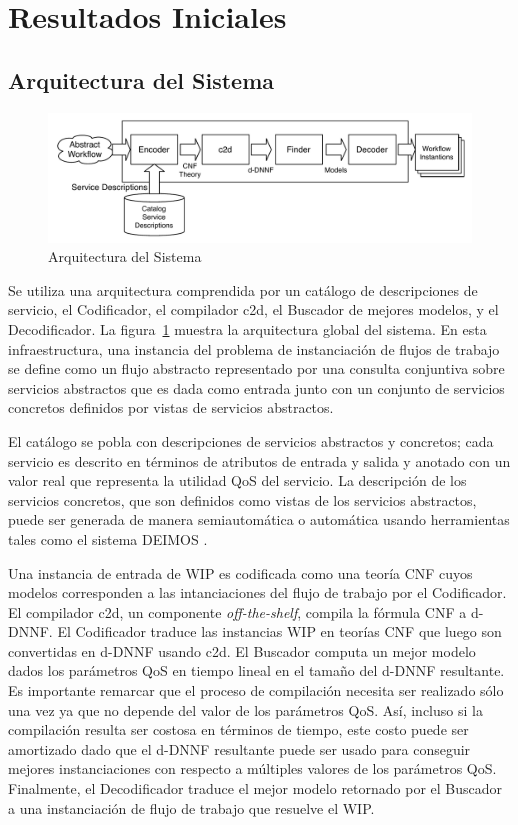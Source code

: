 \section{Resultados Iniciales}

\subsection{Arquitectura del Sistema}

\begin{figure}[t]
\centering
\includegraphics[width=.9\textwidth]{graphics/architecture}
\caption{Arquitectura del Sistema}
\label{fig:architecture}
\end{figure}

Se utiliza una arquitectura comprendida por un catálogo de descripciones de
servicio, el Codificador, el compilador c2d, el Buscador de mejores modelos, y
el Decodificador. La figura~\ref{fig:architecture} muestra la arquitectura global del sistema.
En esta infraestructura, una instancia del problema de instanciación de flujos
de trabajo se define como un flujo abstracto representado por una consulta
conjuntiva sobre servicios abstractos que es dada como entrada junto con un
conjunto de servicios concretos definidos por vistas de servicios abstractos.

El catálogo se pobla con descripciones de servicios abstractos y concretos; cada
servicio es descrito en términos de atributos de entrada y salida y anotado con
un valor real que representa la utilidad QoS del servicio. La descripción de los
servicios concretos, que son definidos como vistas de los servicios abstractos,
puede ser generada de manera semiautomática o automática usando herramientas
tales como el sistema DEIMOS \cite{AmbiteISWC09}.

Una instancia de entrada de WIP es codificada como una teoría CNF cuyos modelos
corresponden a las intanciaciones del flujo de trabajo por el Codificador. El
compilador c2d, un componente \emph{off-the-shelf}, compila la fórmula CNF a
d-DNNF. El Codificador traduce las instancias WIP en teorías CNF que luego son
convertidas en d-DNNF usando c2d. El Buscador computa un mejor modelo dados los
parámetros QoS en tiempo lineal en el tamaño del d-DNNF resultante. Es
importante remarcar que el proceso de compilación necesita ser realizado sólo
una vez ya que no depende del valor de los parámetros QoS. Así, incluso si la
compilación resulta ser costosa en términos de tiempo, este costo puede ser
amortizado dado que el d-DNNF resultante puede ser usado para conseguir mejores
instanciaciones con respecto a múltiples valores de los parámetros QoS.
Finalmente, el Decodificador traduce el mejor modelo retornado por el Buscador
a una instanciación de flujo de trabajo que resuelve el WIP.

